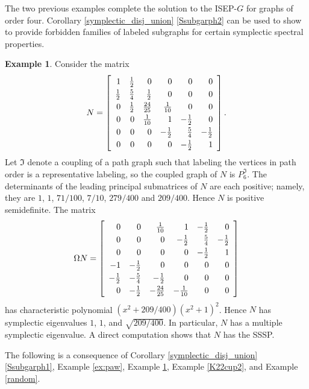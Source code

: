 \documentclass[12pt]{article}
\theoremstyle{definition}
\theoremstyle{definition}
\theoremstyle{definition}
\newtheorem{ex}[thm]{Example}
\numberwithin{figure}{section}
\numberwithin{equation}{section}
\newcommand{\II}{\mathfrak{I}}
\begin{document}
 The two previous examples complete the solution to the ISEP-$G$ for graphs of order four.
Corollary \ref{symplectic_disj_union}
\eqref{Ssubgarph2} can be used to show to provide forbidden families of labeled subgraphs for certain symplectic spectral properties. 

\begin{ex}
\label{ex:P6}
Consider the matrix 
\[ 
N=
\renewcommand{\arraystretch}{1.25}
\left[\begin{array}{rrrrrr}
1 & \frac{1}{2} & 0 & 0 & 0 & 0 \\
\frac{1}{2} & \frac{5}{4} & \frac{1}{2} & 0 & 0 & 0 \\
0 & \frac{1}{2} & \frac{24}{25} & \frac{1}{10} & 0 & 0 \\
0 & 0 & \frac{1}{10} & 1 & -\frac{1}{2} & 0 \\
0 & 0 & 0 & -\frac{1}{2} & \frac{5}{4} & -\frac{1}{2} \\
0 & 0 & 0 & 0 & -\frac{1}{2} & 1
\end{array}\right].
\]
{Let $\II$ denote a coupling of a path graph such that labeling the vertices  in path order is a representative labeling, so the coupled graph  of $N$ is $P_6^\II$.} 
The determinants of the leading principal submatrices of $N$ are
each positive; namely, they are
$1$, $1$, $71/100$, $7/10$,
$279/400$ and $209/400$.
Hence $N$ is positive semidefinite. 
The matrix 
\[
\Omega N=
\renewcommand{\arraystretch}{1.25}
\left[\begin{array}{rrrrrr}
0 & 0 & \frac{1}{10} & 1 & -\frac{1}{2} & 0 \\
0 & 0 & 0 & -\frac{1}{2} & \frac{5}{4} & -\frac{1}{2} \\
0 & 0 & 0 & 0 & -\frac{1}{2} & 1 \\
-1 & -\frac{1}{2} & 0 & 0 & 0 & 0 \\
-\frac{1}{2} & -\frac{5}{4} & -\frac{1}{2} & 0 & 0 & 0 \\
0 & -\frac{1}{2} & -\frac{24}{25} & -\frac{1}{10} & 0 & 0
\end{array}\right]
\] 
 has characteristic polynomial $(x^2 + 209/400)(x^2 + 1)^2$.
Hence $N$ has symplectic eigenvalues $1$, $1$, and
 $\sqrt{209/400}$. In particular, $N$ has a multiple symplectic eigenvalue.
A direct computation shows that $N$ has the SSSP. 
\end{ex}  

The following is a consequence of Corollary \ref{symplectic_disj_union}
\eqref{Ssubgarph1}, 
Example \ref{ex:paw}, Example \ref{ex:P6}, Example \ref{K22cup2}, and Example \ref{random}.
\end{document}
